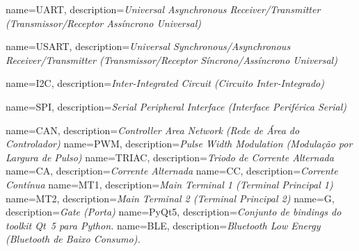 {
   name={UART},
   description={\textit{Universal Asynchronous Receiver/Transmitter (Transmissor/Receptor Assíncrono Universal)}}
}

{
   name={USART},
   description={\textit{Universal Synchronous/Asynchronous Receiver/Transmitter (Transmissor/Receptor Síncrono/Assíncrono Universal)}}
}

{
   name={I2C},
   description={\textit{Inter-Integrated Circuit (Circuito Inter-Integrado)}}
}

{
   name={SPI},
   description={\textit{Serial Peripheral Interface (Interface Periférica Serial)}}
}

{
   name={CAN},
   description={\textit{Controller Area Network (Rede de Área do Controlador)}}
}
{
   name={PWM},
   description={\textit{Pulse Width Modulation (Modulação por Largura de Pulso)}}
}
{
   name={TRIAC},
   description={\textit{Triodo de Corrente Alternada}}
}
{
   name={CA},
   description={\textit{Corrente Alternada}}
}
{
   name={CC},
   description={\textit{Corrente Contínua}}
}
{
   name={MT1},
   description={\textit{Main Terminal 1 (Terminal Principal 1)}}
}
{
   name={MT2},
   description={\textit{Main Terminal 2 (Terminal Principal 2)}}
}
{
   name={G},
   description={\textit{Gate (Porta)}}
}
{
name={PyQt5},
description={\textit{Conjunto de bindings do toolkit Qt~5 para Python.}}
}
{
name={BLE},
description={\textit{Bluetooth Low Energy (Bluetooth de Baixo Consumo).}}
}

%
%

